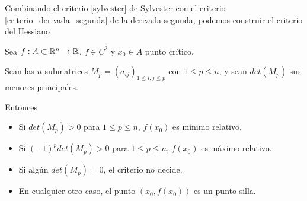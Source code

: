 Combinando el criterio \ref{sylvester} de Sylvester con el criterio \ref{criterio_derivada_segunda} de la derivada segunda, podemos construir el criterio del Hessiano

\begin{theorem} \label{criterio_hessiano}
Sea $f : A \subset \mathbb{R}^n \to \mathbb{R}$, $ f \in C^2$ y $x_0 \in A$ punto crítico.

Sean las $n$ submatrices $M_p = (a_{ij})_{1 \leq i,j \leq p}$ con $1 \leq p \leq n $, y sean $det(M_p)$ sus menores principales.

Entonces 

\begin{itemize}
\item Si $det(M_p) > 0$ para $1 \leq p \leq n$, $f(x_0)$ es mínimo relativo.

\item Si $(-1)^p det(M_p) > 0$ para $1 \leq p \leq n$, $f(x_0)$ es máximo relativo.

\item Si algún $det(M_p) = 0$, el criterio no decide.

\item En cualquier otro caso, el punto $(x_0, f(x_0))$ es un punto silla.
\end{itemize}
\end{theorem}

